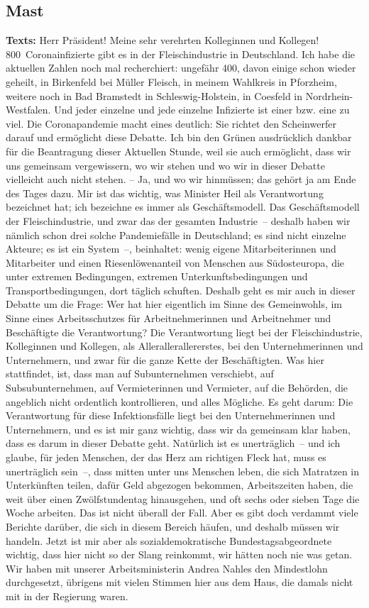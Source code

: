 \documentclass{article}
\begin{document}
\subsection{Mast}
\noindent\textbf{Texts:} Herr Präsident! Meine sehr verehrten Kolleginnen und Kollegen! 800 Coronainfizierte gibt es in der Fleischindustrie in Deutschland. Ich habe die aktuellen Zahlen noch mal recherchiert: ungefähr 400, davon einige schon wieder geheilt, in Birkenfeld bei Müller Fleisch, in meinem Wahlkreis in Pforzheim, weitere noch in Bad Bramstedt in Schleswig-Holstein, in Coesfeld in Nordrhein-Westfalen. Und jeder einzelne und jede einzelne Infizierte ist einer bzw. eine zu viel.  Die Coronapandemie macht eines deutlich: Sie richtet den Scheinwerfer darauf und ermöglicht diese Debatte. Ich bin den Grünen ausdrücklich dankbar für die Beantragung dieser Aktuellen Stunde, weil sie auch ermöglicht, dass wir uns gemeinsam vergewissern, wo wir stehen und wo wir in dieser Debatte vielleicht auch nicht stehen.  – Ja, und wo wir hinmüssen; das gehört ja am Ende des Tages dazu. Mir ist das wichtig, was Minister Heil als Verantwortung bezeichnet hat; ich bezeichne es immer als Geschäftsmodell. Das Geschäftsmodell der Fleischindustrie, und zwar das der gesamten Industrie – deshalb haben wir nämlich schon drei solche Pandemiefälle in Deutschland; es sind nicht einzelne Akteure; es ist ein System –, beinhaltet: wenig eigene Mitarbeiterinnen und Mitarbeiter und einen Riesenlöwenanteil von Menschen aus Südosteuropa, die unter extremen Bedingungen, extremen Unterkunftsbedingungen und Transportbedingungen, dort täglich schuften. Deshalb geht es mir auch in dieser Debatte um die Frage: Wer hat hier eigentlich im Sinne des Gemeinwohls, im Sinne eines Arbeitsschutzes für Arbeitnehmerinnen und Arbeitnehmer und Beschäftigte die Verantwortung? Die Verantwortung liegt bei der Fleischindustrie, Kolleginnen und Kollegen, als Allerallerallererstes,  bei den Unternehmerinnen und Unternehmern, und zwar für die ganze Kette der Beschäftigten. Was hier stattfindet, ist, dass man auf Subunternehmen verschiebt, auf Subsubunternehmen, auf Vermieterinnen und Vermieter, auf die Behörden, die angeblich nicht ordentlich kontrollieren, und alles Mögliche. Es geht darum: Die Verantwortung für diese Infektionsfälle liegt bei den Unternehmerinnen und Unternehmern, und es ist mir ganz wichtig, dass wir da gemeinsam klar haben, dass es darum in dieser Debatte geht.  Natürlich ist es unerträglich – und ich glaube, für jeden Menschen, der das Herz am richtigen Fleck hat, muss es unerträglich sein –, dass mitten unter uns Menschen leben, die sich Matratzen in Unterkünften teilen, dafür Geld abgezogen bekommen, Arbeitszeiten haben, die weit über einen Zwölfstundentag hinausgehen, und oft sechs oder sieben Tage die Woche arbeiten. Das ist nicht überall der Fall. Aber es gibt doch verdammt viele Berichte darüber, die sich in diesem Bereich häufen, und deshalb müssen wir handeln. Jetzt ist mir aber als sozialdemokratische Bundestagsabgeordnete wichtig, dass hier nicht so der Slang reinkommt, wir hätten noch nie was getan. Wir haben mit unserer Arbeitsministerin Andrea Nahles den Mindestlohn durchgesetzt, übrigens mit vielen Stimmen hier aus dem Haus, die damals nicht mit in der Regierung waren. 
\end{document}
